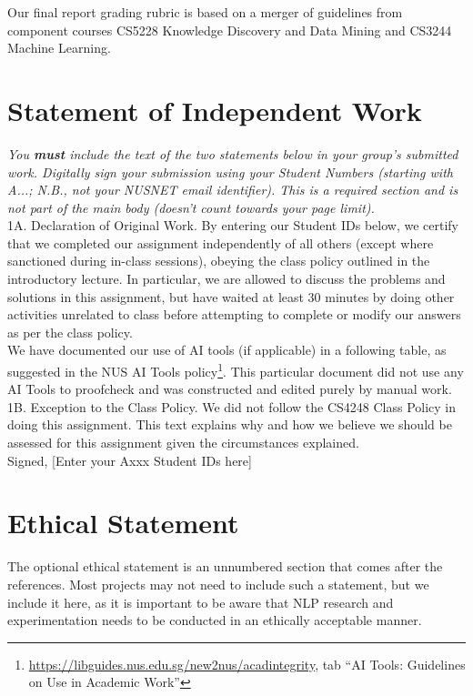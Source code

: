 \documentclass[11pt]{article}
\begin{document}
Our final report grading rubric is based on a merger of guidelines from component courses CS5228 Knowledge Discovery and Data Mining and CS3244 Machine Learning.

\section*{Statement of Independent Work}

{\it You {\bf must} include the text of the two statements below in your group's submitted work.  Digitally sign your submission using your Student Numbers (starting with A...; N.B., not your NUSNET email identifier). This is a required section and is not part of the main body (doesn't count towards your page limit).} \\

\noindent 1A. Declaration of Original Work. By entering our Student IDs below, we certify that we completed our assignment independently of all others (except where sanctioned during in-class sessions), obeying the class policy outlined in the introductory lecture. In particular, we are allowed to discuss the problems and solutions in this assignment, but have waited at least 30 minutes by doing other activities unrelated to class before attempting to complete or modify our answers as per the class policy. \\

We have documented our use of AI tools (if applicable) in a following table, as suggested in the NUS AI Tools policy\footnote{\url{https://libguides.nus.edu.sg/new2nus/acadintegrity}, tab ``AI Tools: Guidelines on Use in Academic Work''}.  This particular document did not use any AI Tools to proofcheck and was constructed and edited purely by manual work.\\

\noindent 1B. Exception to the Class Policy. We did not follow the CS4248 Class Policy in doing this assignment. This text explains why and how we believe we should be assessed for this assignment given the circumstances explained. \\

\noindent Signed, [Enter your Axxx Student IDs here]

\section*{Ethical Statement}

The optional ethical statement is an unnumbered section that comes after the references.  Most projects may not need to include such a statement, but we include it here, as it is important to be aware that NLP research and experimentation needs to be conducted in an ethically acceptable manner.  
\end{document}
